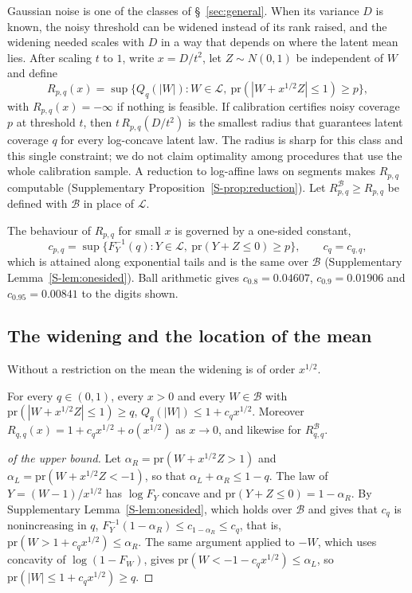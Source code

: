 \documentclass[lineno]{biometrika}
\newcommand{\pr}{\mathrm{pr}}
\newcommand{\LC}{\mathcal{L}}
\begin{document}
Gaussian noise is one of the classes of \S~\ref{sec:general}. When its variance $D$ is known, the noisy threshold can be widened instead of its rank raised, and the widening needed scales with $D$ in a way that depends on where the latent mean lies. After scaling $t$ to $1$, write $x = D/t^2$, let $Z \sim N(0,1)$ be independent of $W$ and define
\begin{equation}\label{eq:R}
R_{p,q}(x) = \sup\{ Q_q(|W|) : W \in \LC,\ \pr(|W + x^{1/2}Z| \le 1) \ge p \},
\end{equation}
with $R_{p,q}(x) = -\infty$ if nothing is feasible. If calibration certifies noisy coverage $p$ at threshold $t$, then $t\,R_{p,q}(D/t^2)$ is the smallest radius that guarantees latent coverage $q$ for every log-concave latent law. The radius is sharp for this class and this single constraint; we do not claim optimality among procedures that use the whole calibration sample. A reduction to log-affine laws on segments makes $R_{p,q}$ computable (Supplementary Proposition~\ref{S-prop:reduction}). Let $R^{\mathcal B}_{p,q} \ge R_{p,q}$ be defined with $\mathcal B$ in place of $\LC$.

The behaviour of $R_{p,q}$ for small $x$ is governed by a one-sided constant,
\[
c_{p,q} = \sup\{F_Y^{-1}(q) : Y \in \LC,\ \pr(Y + Z \le 0) \ge p\}, \qquad c_q = c_{q,q},
\]
which is attained along exponential tails and is the same over $\mathcal B$ (Supplementary Lemma~\ref{S-lem:onesided}). Ball arithmetic gives $c_{0.8} = 0.04607$, $c_{0.9} = 0.01906$ and $c_{0.95} = 0.00841$ to the digits shown.

\subsection{The widening and the location of the mean}

Without a restriction on the mean the widening is of order $x^{1/2}$.

\begin{theorem}\label{thm:small}
For every $q \in (0,1)$, every $x > 0$ and every $W \in \mathcal B$ with $\pr(|W + x^{1/2}Z| \le 1) \ge q$, $Q_q(|W|) \le 1 + c_q x^{1/2}$. Moreover $R_{q,q}(x) = 1 + c_q x^{1/2} + o(x^{1/2})$ as $x \to 0$, and likewise for $R^{\mathcal B}_{q,q}$.
\end{theorem}

\begin{proof}[of the upper bound]
Let $\alpha_R = \pr(W + x^{1/2}Z > 1)$ and $\alpha_L = \pr(W + x^{1/2}Z < -1)$, so that $\alpha_L + \alpha_R \le 1 - q$. The law of $Y = (W - 1)/x^{1/2}$ has $\log F_Y$ concave and $\pr(Y + Z \le 0) = 1 - \alpha_R$. By Supplementary Lemma~\ref{S-lem:onesided}, which holds over $\mathcal B$ and gives that $c_q$ is nonincreasing in $q$, $F_Y^{-1}(1 - \alpha_R) \le c_{1-\alpha_R} \le c_q$, that is, $\pr(W > 1 + c_q x^{1/2}) \le \alpha_R$. The same argument applied to $-W$, which uses concavity of $\log(1 - F_W)$, gives $\pr(W < -1 - c_q x^{1/2}) \le \alpha_L$, so $\pr(|W| \le 1 + c_q x^{1/2}) \ge q$.
\end{proof}
\end{document}
